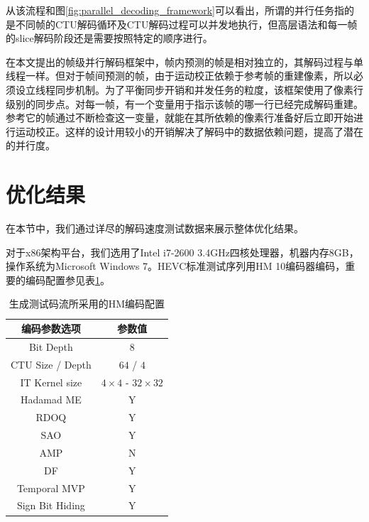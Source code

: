 从该流程和图\ref{fig:parallel_decoding_framework}可以看出，所谓的并行任务指的是不同帧的CTU解码循环及CTU解码过程可以并发地执行，但高层语法和每一帧的slice解码阶段还是需要按照特定的顺序进行。

在本文提出的帧级并行解码框架中，帧内预测的帧是相对独立的，其解码过程与单线程一样。但对于帧间预测的帧，由于运动校正依赖于参考帧的重建像素，所以必须设立线程同步机制。为了平衡同步开销和并发任务的粒度，该框架使用了像素行级别的同步点。对每一帧，有一个变量用于指示该帧的哪一行已经完成解码重建。参考它的帧通过不断检查这一变量，就能在其所依赖的像素行准备好后立即开始进行运动校正。这样的设计用较小的开销解决了解码中的数据依赖问题，提高了潜在的并行度。

\section{优化结果}

在本节中，我们通过详尽的解码速度测试数据来展示整体优化结果。

对于x86架构平台，我们选用了Intel i7-2600 3.4GHz四核处理器，机器内存8GB，操作系统为Microsoft Windows 7。HEVC标准测试序列用HM 10编码器编码，重要的编码配置参见表\ref{table:HM_config}。

\begin{table}[t]
	\begin{center}
		\caption{生成测试码流所采用的HM编码配置} \label{table:HM_config}
		\renewcommand{\arraystretch}{1.5}
		\begin{tabular}{c|c}
			\hline
			\textbf{编码参数选项} & \textbf{参数值} \\
			\hline
			\hline
			Bit Depth & $8$ \\
			\hline
			CTU Size / Depth & $64$ / $4$ \\
			\hline
			IT Kernel size & $4 \times 4$ - $32 \times 32$ \\
			\hline
			Hadamad ME & Y \\
			\hline
			RDOQ & Y \\
			\hline
			SAO & Y \\
			\hline
			AMP & N \\
			\hline
			DF & Y \\
			\hline
			Temporal MVP & Y \\
			\hline
			Sign Bit Hiding & Y \\
			\hline
		\end{tabular}
	\end{center}
\end{table}

